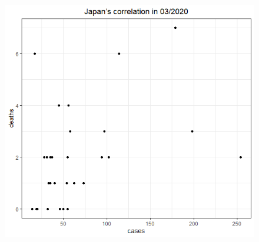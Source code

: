 \documentclass[english,10pt,table]{beamer}
\begin{document}
{\begin{figure}[H]
\begin{center}
        \includegraphics[scale = 0.2]{ix/ix.2/JPN_03_2020.png}
    \end{center}
    \end{figure}
}
\end{document}
